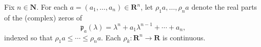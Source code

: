Fix $n \in \mathbf{N}$. For each $a = (a_1, \dots, a_n) \in \mathbf{R}^n$, let $\rho_1 a, \dots, \rho_n a$ denote the real parts of the (complex) zeros of
$$\mathfrak{p}_a(\lambda) = \lambda^n + a_1 \lambda^{n-1} + \cdots + a_n,$$
indexed so that $\rho_1 a \leq \cdots \leq \rho_n a$. Each $\rho_k : \mathbf{R}^n \to \mathbf{R}$ is continuous.